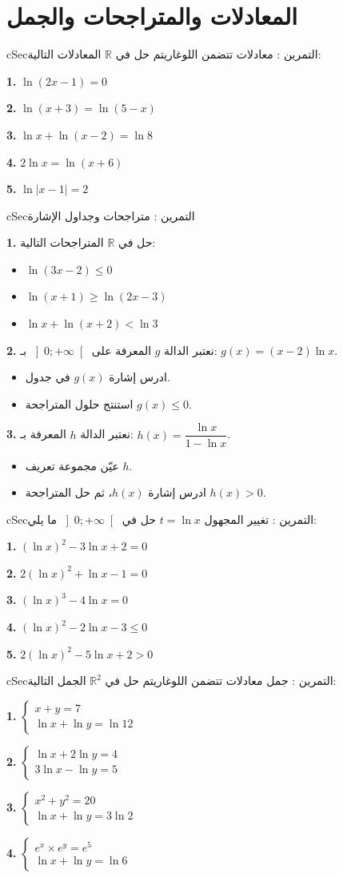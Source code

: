 \documentclass[12pt,a4paper]{article}
\newenvironment{BOX}[2]{\begin{otherlanguage}{english}\begin{arbox}{#1}{#2}}{\end{arbox}\end{otherlanguage}}
\newcounter{exo}
\newenvironment{tamrin}[1]{\stepcounter{exo}\begin{BOX}{cSec}{التمرين \theexo: #1}}{\end{BOX}}
\newcommand{\R}{\mathbb{R}}
\newenvironment{sq}{\begin{itemize}[leftmargin=2.4em,itemsep=3pt]}{\end{itemize}}
\newcommand{\qa}{\item[(أ)]}\newcommand{\qb}{\item[(ب)]}\newcommand{\qc}{\item[(جـ)]}\newcommand{\qd}{\item[(د)]}\newcommand{\qe}{\item[(هـ)]}
\newcommand{\QQ}[1]{\par\smallskip\textbf{#1.} }
\begin{document}
\section{المعادلات والمتراجحات والجمل}

\begin{tamrin}{معادلات تتضمن اللوغاريتم}
حل في $\R$ المعادلات التالية:
\QQ{1} $\ln(2x-1)=0$
\QQ{2} $\ln(x+3)=\ln(5-x)$
\QQ{3} $\ln x+\ln(x-2)=\ln 8$
\QQ{4} $2\ln x=\ln(x+6)$
\QQ{5} $\ln|x-1|=2$
\end{tamrin}

\begin{tamrin}{متراجحات وجداول الإشارة}
\QQ{1} حل في $\R$ المتراجحات التالية:
\begin{sq}
\qa $\ln(3x-2)\leq 0$
\qb $\ln(x+1)\geq\ln(2x-3)$
\qc $\ln x+\ln(x+2)<\ln 3$
\end{sq}
\QQ{2} نعتبر الدالة $g$ المعرفة على $\left]0;+\infty\right[$ بـ: $g(x)=(x-2)\ln x$.
\begin{sq}
\qa ادرس إشارة $g(x)$ في جدول.
\qb استنتج حلول المتراجحة $g(x)\leq 0$.
\end{sq}
\QQ{3} نعتبر الدالة $h$ المعرفة بـ: $h(x)=\dfrac{\ln x}{1-\ln x}$.
\begin{sq}
\qa عيّن مجموعة تعريف $h$.
\qb ادرس إشارة $h(x)$، ثم حل المتراجحة $h(x)>0$.
\end{sq}
\end{tamrin}

\begin{tamrin}{تغيير المجهول $t=\ln x$}
حل في $\left]0;+\infty\right[$ ما يلي:
\QQ{1} $\left(\ln x\right)^{2}-3\ln x+2=0$
\QQ{2} $2\left(\ln x\right)^{2}+\ln x-1=0$
\QQ{3} $\left(\ln x\right)^{3}-4\ln x=0$
\QQ{4} $\left(\ln x\right)^{2}-2\ln x-3\leq 0$
\QQ{5} $2\left(\ln x\right)^{2}-5\ln x+2>0$
\end{tamrin}

\begin{tamrin}{جمل معادلات تتضمن اللوغاريتم}
حل في $\R^{2}$ الجمل التالية:
\QQ{1} $\begin{cases} x+y=7\\ \ln x+\ln y=\ln 12\end{cases}$

\QQ{2} $\begin{cases} \ln x+2\ln y=4\\ 3\ln x-\ln y=5\end{cases}$
\QQ{3} $\begin{cases} x^{2}+y^{2}=20\\ \ln x+\ln y=3\ln 2\end{cases}$

\QQ{4} $\begin{cases} e^{x}\times e^{y}=e^{5}\\ \ln x+\ln y=\ln 6\end{cases}$
\end{tamrin}
\end{document}
